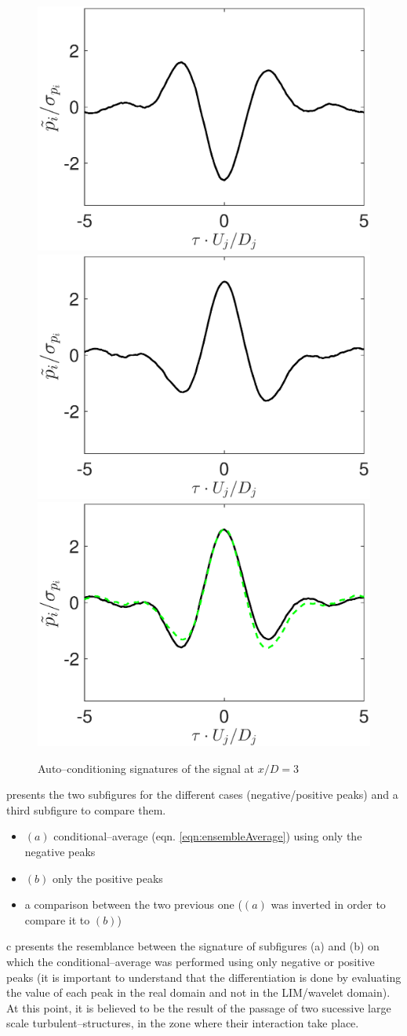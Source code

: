 \begin{figure}
	\centering
	\includegraphics[width=0.45\linewidth]{Figures/negativePeak.eps}%
	\includegraphics[width=0.45\linewidth]{Figures/positivePeak.eps}\\	
	\includegraphics[width=0.45\linewidth]{Figures/compPeaks}
	\caption{Auto--conditioning signatures of the signal at $x/D = 3$} \label{fig:compPeaks}
\end{figure}
 presents the two subfigures for the different cases (negative/positive peaks) and a third subfigure to compare them.
\begin{itemize}
  \item $(a)$ conditional--average (eqn. \ref{eqn:ensembleAverage}) using only the negative peaks
  \item $(b)$ only the positive peaks
  \item a comparison between the two previous one ($(a)$ was inverted in order to compare it to $(b)$)
\end{itemize}
c presents the resemblance between the signature of subfigures (a) and (b) on which the conditional--average was performed using only negative or positive peaks (it is important to understand that the differentiation is done by evaluating the value of each peak in the real domain and not in the LIM/wavelet domain). At this point, it is believed to be the result of the passage of two sucessive large scale turbulent--structures, in the zone where their interaction take place.
